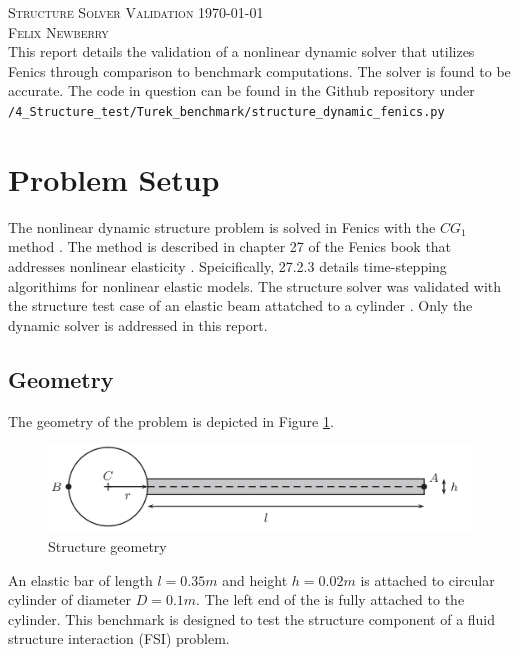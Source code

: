 \documentclass{article}
\begin{document}
\textsc{\Large Structure Solver Validation \hfill \today}\\[0.5cm] %
\textsc{\large Felix Newberry}\\

This report details the  validation of a nonlinear dynamic solver that utilizes Fenics  through comparison to benchmark computations. The solver is found to be accurate. The code in question can be found in the Github repository under \verb|/4_Structure_test/Turek_benchmark/structure_dynamic_fenics.py|


\section{Problem Setup} 

The nonlinear dynamic structure problem is solved in Fenics with the $CG_1$ method \cite{eriksson1996computational}. The method is described in chapter 27 of the Fenics book that addresses nonlinear elasticity \cite{logg2012automated}. Speicifically, 27.2.3 details time-stepping algorithims for nonlinear elastic models. The structure solver was validated with the structure test case of an elastic beam attatched to a cylinder \cite{turek2006proposal}. Only the dynamic solver is addressed in this report. 

\subsection{Geometry}
The geometry of the problem is depicted in Figure \ref{fig:geom}. 

\FloatBarrier
\begin{figure}[h]
\centering
	\includegraphics[width=\textwidth]{struct_geom}
	\caption{Structure geometry \cite{turek2006proposal}}
	\label{fig:geom}
\end{figure}
\FloatBarrier

An elastic bar of length $l = 0.35 m$ and height $ h = 0.02 m$ is attached to circular cylinder of diameter $D = 0.1 m$. The left end of the is fully attached to the cylinder. This benchmark is designed to test the structure component of a fluid structure interaction (FSI) problem. 
\end{document}
